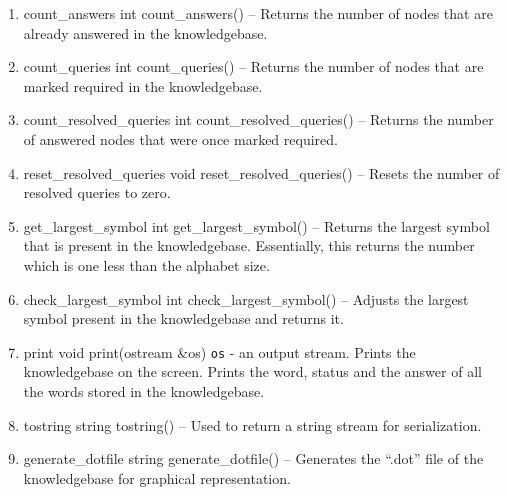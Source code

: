 \begin{enumerate}
\item \begin{detail}
{count\_answers}
{int count\_answers()}
{--}
{Returns the number of nodes that are already answered in the knowledgebase.} 
\end{detail}
\item \begin{detail}
{count\_queries}
{int count\_queries()}
{--}
{Returns the number of nodes that are marked required in the knowledgebase.} 
\end{detail}
\item \begin{detail}
{count\_resolved\_queries}
{int count\_resolved\_queries()}
{--}
{Returns the number of answered nodes that were once marked required.} 
\end{detail}
\item \begin{detail}
{reset\_resolved\_queries}
{void reset\_resolved\_queries()}
{--}
{Resets the number of resolved queries to zero.} 
\end{detail}
\item \begin{detail}
{get\_largest\_symbol}
{int get\_largest\_symbol()}
{--}
{Returns the largest symbol that is present in the knowledgebase. Essentially, this returns the number which is one less than the alphabet size.} 
\end{detail}
\item \begin{detail}
{check\_largest\_symbol}
{int check\_largest\_symbol()}
{--}
{Adjusts the largest symbol present in the knowledgebase and returns it.} 
\end{detail}
\item \begin{detail}
{print}
{void print(ostream \&os)}
{\texttt{os} - an output stream.}
{Prints the knowledgebase on the screen. Prints the word, status and the answer of all the words stored in the knowledgebase.} 
\end{detail}
\item \begin{detail}
{tostring}
{string tostring()}
{--}
{Used to return a string stream for serialization.} 
\end{detail}
\item \begin{detail}
{generate\_dotfile}
{string generate\_dotfile()}
{--}
{Generates the ``.dot'' file of the knowledgebase for graphical representation.} 

\end{detail}
\end{enumerate}
